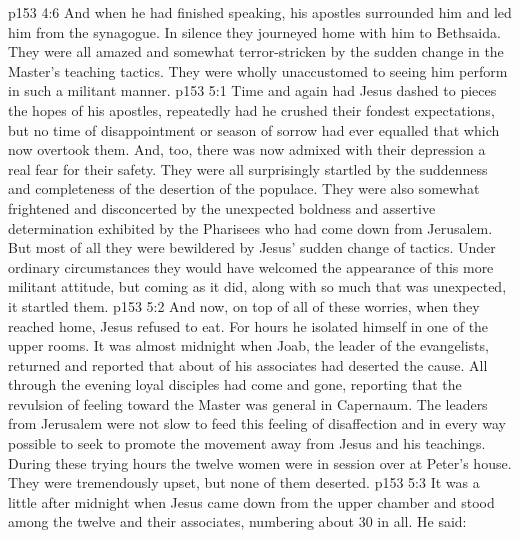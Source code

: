 \vs p153 4:6 And when he had finished speaking, his apostles surrounded him and led him from the synagogue. In silence they journeyed home with him to Bethsaida. They were all amazed and somewhat terror\hyp{}stricken by the sudden change in the Master’s teaching tactics. They were wholly unaccustomed to seeing him perform in such a militant manner.
\vs p153 5:1 Time and again had Jesus dashed to pieces the hopes of his apostles, repeatedly had he crushed their fondest expectations, but no time of disappointment or season of sorrow had ever equalled that which now overtook them. And, too, there was now admixed with their depression a real fear for their safety. They were all surprisingly startled by the suddenness and completeness of the desertion of the populace. They were also somewhat frightened and disconcerted by the unexpected boldness and assertive determination exhibited by the Pharisees who had come down from Jerusalem. But most of all they were bewildered by Jesus’ sudden change of tactics. Under ordinary circumstances they would have welcomed the appearance of this more militant attitude, but coming as it did, along with so much that was unexpected, it startled them.
\vs p153 5:2 And now, on top of all of these worries, when they reached home, Jesus refused to eat. For hours he isolated himself in one of the upper rooms. It was almost midnight when Joab, the leader of the evangelists, returned and reported that about  of his associates had deserted the cause. All through the evening loyal disciples had come and gone, reporting that the revulsion of feeling toward the Master was general in Capernaum. The leaders from Jerusalem were not slow to feed this feeling of disaffection and in every way possible to seek to promote the movement away from Jesus and his teachings. During these trying hours the twelve women were in session over at Peter’s house. They were tremendously upset, but none of them deserted.
\vs p153 5:3 It was a little after midnight when Jesus came down from the upper chamber and stood among the twelve and their associates, numbering about 30 in all. He said: 
